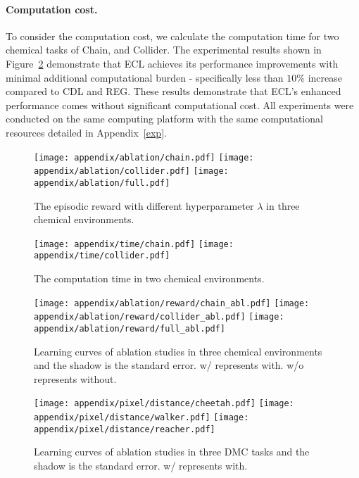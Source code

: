 \vspace{-3mm}

\paragraph{Computation cost.} 
To consider the computation cost, we calculate the computation time for two chemical tasks of Chain, and Collider. The experimental results shown in Figure~\ref{fig:appendix_time} demonstrate that ECL achieves its performance improvements with minimal additional computational burden - specifically less than $10\%$ increase compared to CDL and REG. These results demonstrate that ECL's enhanced performance comes without significant computational cost. All experiments were conducted on the same computing platform with the same computational resources detailed in Appendix~\ref{exp}.

\begin{figure}[h]
    \centering
    \texttt{[image: appendix/ablation/chain.pdf]}
     \texttt{[image: appendix/ablation/collider.pdf]}
      \texttt{[image: appendix/ablation/full.pdf]}
   \caption{The episodic reward with different hyperparameter $\lambda$ in three chemical environments.}
\label{fig:abl_reward_abl}
\end{figure}


\begin{figure}[h]
    \centering
    \texttt{[image: appendix/time/chain.pdf]}
     \texttt{[image: appendix/time/collider.pdf]}
   \caption{The computation time in two chemical environments.}
\label{fig:appendix_time}
\end{figure}

\begin{figure}[H]
    \centering
    \texttt{[image: appendix/ablation/reward/chain\_abl.pdf]}
    \texttt{[image: appendix/ablation/reward/collider\_abl.pdf]}
    \texttt{[image: appendix/ablation/reward/full\_abl.pdf]}
    \caption{Learning curves of ablation studies in three chemical environments and the shadow is the standard error. w/ represents with. w/o represents without.}
    \label{fig:abl}
\end{figure}


\begin{figure}[h]
    \centering
    \texttt{[image: appendix/pixel/distance/cheetah.pdf]}
    \texttt{[image: appendix/pixel/distance/walker.pdf]}
    \texttt{[image: appendix/pixel/distance/reacher.pdf]}
    \caption{Learning curves of ablation studies in three DMC tasks and the shadow is the standard error. w/ represents with.}
    \label{fig:abl_distance_emp}
\end{figure}

